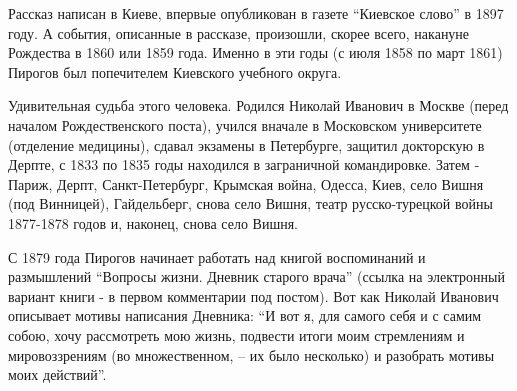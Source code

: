 \begin{multicols}{2} %
\setlength{\parindent}{0pt}






\end{multicols} %

Рассказ написан в Киеве, впервые опубликован в газете \enquote{Киевское слово} в 1897
году. А события, описанные в рассказе, произошли, скорее всего, накануне
Рождества в 1860 или 1859 года. Именно в эти годы (с июля 1858 по март 1861)
Пирогов был попечителем Киевского учебного округа. 


Удивительная судьба этого человека. Родился Николай Иванович в Москве (перед
началом Рождественского поста), учился вначале в Московском университете
(отделение медицины), сдавал экзамены в Петербурге, защитил докторскую в
Дерпте, с 1833 по 1835 годы находился в заграничной командировке. Затем -
Париж, Дерпт, Санкт-Петербург, Крымская война, Одесса, Киев, село Вишня (под
Винницей), Гайдельберг, снова село Вишня, театр русско-турецкой войны 1877-1878
годов и, наконец, снова село Вишня. 

С 1879 года Пирогов начинает работать над книгой воспоминаний и размышлений
\enquote{Вопросы жизни. Дневник старого врача} (ссылка на электронный вариант книги - в
первом комментарии под постом). Вот как Николай Иванович описывает мотивы
написания Дневника: \enquote{И вот я, для самого себя и с самим собою, хочу рассмотреть
мою жизнь, подвести итоги моим стремлениям и мировоззрениям (во множественном,
– их было несколько) и разобрать мотивы моих действий}.

